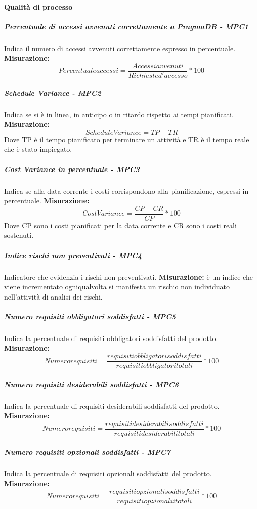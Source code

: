 \paragraph{Qualità di processo}
\subparagraph{Percentuale di accessi avvenuti correttamente a PragmaDB - MPC1}
Indica il numero  di accessi avvenuti correttamente espresso in percentuale.\\
\textbf{Misurazione:}\begin{equation}
Percentuale accessi = \frac{Accessi avvenuti}{Richieste d'accesso}*100
\end{equation}
\subparagraph{Schedule Variance - MPC2}
Indica se si è in linea, in anticipo o in ritardo rispetto ai tempi pianificati.\\
\textbf{Misurazione:}\begin{equation}
Schedule Variance = TP - TR 
\end{equation}
Dove TP è il tempo pianificato per terminare un attività e TR è il tempo reale che è stato impiegato.
\subparagraph{Cost Variance in percentuale - MPC3}
Indica se alla data corrente i costi corrispondono alla pianificazione, espressi in percentuale.
\textbf{Misurazione:}\begin{equation}
Cost Variance = \frac{CP - CR}{CP}*100 
\end{equation}
Dove CP sono i costi pianificati per la data corrente e CR sono i costi reali sostenuti.
\subparagraph{Indice rischi non preventivati - MPC4}
Indicatore che evidenzia i rischi non preventivati.
\textbf{Misurazione:} è un indice che viene incrementato ogniqualvolta si manifesta un rischio non individuato nell'attività di analisi dei rischi.
\subparagraph{Numero requisiti obbligatori soddisfatti - MPC5}
Indica la percentuale di requisiti obbligatori soddisfatti del prodotto.
\textbf{Misurazione:}\begin{equation}
Numero requisiti = \frac{requisiti obbligatori soddisfatti}{requisiti obbligatori totali}*100
\end{equation}
\subparagraph{Numero requisiti desiderabili soddisfatti - MPC6}
Indica la percentuale di requisiti desiderabili soddisfatti del prodotto.
\textbf{Misurazione:}\begin{equation}
Numero requisiti = \frac{requisiti desiderabili soddisfatti}{requisiti desiderabili totali}*100
\end{equation}
\subparagraph{Numero requisiti opzionali soddisfatti - MPC7}
Indica la percentuale di requisiti opzionali soddisfatti del prodotto.
\textbf{Misurazione:}\begin{equation}
Numero requisiti = \frac{requisiti opzionali soddisfatti}{requisiti opzionalii totali}*100
\end{equation}


